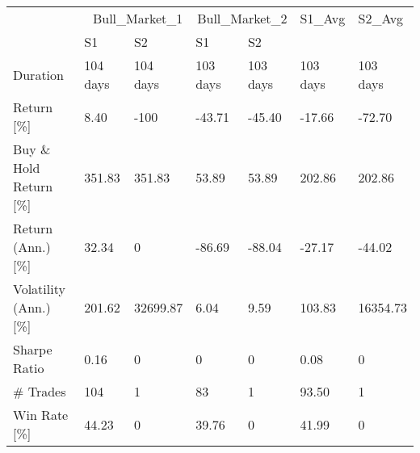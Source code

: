 \begin{tabular}{lllllll}
\toprule
 & \multicolumn{2}{r}{Bull_Market_1} & \multicolumn{2}{r}{Bull_Market_2} & S1_Avg & S2_Avg \\
 & S1 & S2 & S1 & S2 &  &  \\
\midrule
Duration & 104 days   & 104 days   & 103 days   & 103 days   & 103 days   & 103 days   \\
Return  [\%] & 8.40 & -100  & -43.71 & -45.40 & -17.66 & -72.70 \\
Buy \& Hold Return  [\%] & 351.83 & 351.83 & 53.89 & 53.89 & 202.86 & 202.86 \\
Return (Ann.)  [\%] & 32.34 & 0  & -86.69 & -88.04 & -27.17 & -44.02 \\
Volatility (Ann.)  [\%] & 201.62 & 32699.87 & 6.04 & 9.59 & 103.83 & 16354.73 \\
Sharpe Ratio & 0.16 & 0  & 0  & 0  & 0.08 & 0  \\
\# Trades & 104 & 1 & 83 & 1 & 93.50 & 1  \\
Win Rate  [\%] & 44.23 & 0  & 39.76 & 0  & 41.99 & 0  \\
\bottomrule
\end{tabular}
